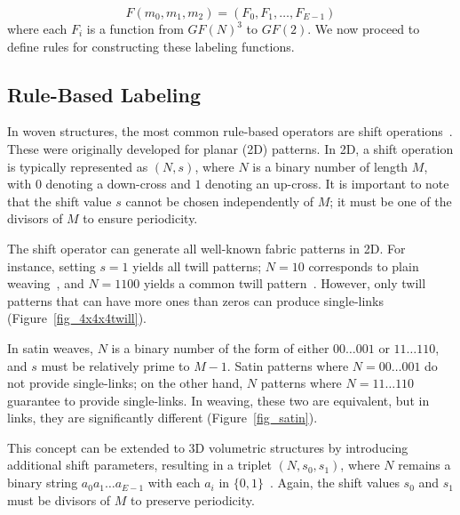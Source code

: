 \documentclass[times,twocolumn,final]{elsarticle}
\begin{document}
$$F(m_0, m_1, m_2) = \left(F_0, F_1, \ldots, F_{E-1} \right)$$
where each $F_i$ is a function from $GF(N)^3$ to $GF(2)$. We now proceed to define rules for constructing these labeling functions.

\subsection{Rule-Based Labeling}

In woven structures, the most common rule-based operators are shift operations~\cite{grunbaum1980satins, grunbaum1985catalogue, grunbaum1986extension, grunbaum1988isonemal}. These were originally developed for planar (2D) patterns. In 2D, a shift operation is typically represented as $(N,s)$, where $N$ is a binary number of length $M$, with $0$ denoting a down-cross and $1$ denoting an up-cross. It is important to note that the shift value $s$ cannot be chosen independently of $M$; it must be one of the divisors of $M$ to ensure periodicity.

The shift operator can generate all well-known fabric patterns in 2D. For instance, setting $s=1$ yields all twill patterns; $N=10$ corresponds to plain weaving~\cite{akleman2009cyclic}, and $N=1100$ yields a common twill pattern~\cite{akleman2011cyclic}. However, only twill patterns that can have more ones than zeros can produce single-links (Figure~\ref{fig_4x4x4twill}).

In satin weaves, $N$ is a binary number of the form of either $00\ldots001$ or $11\ldots110$, and $s$ must be relatively prime to $M-1$. Satin patterns where $N=00\ldots001$ do not provide single-links; on the other hand, $N$ patterns where $N=11\ldots110$ guarantee to provide single-links. In weaving, these two are equivalent, but in links, they are significantly different (Figure~\ref{fig_satin}). 

This concept can be extended to 3D volumetric structures by introducing additional shift parameters, resulting in a triplet $(N, s_0, s_1)$, where $N$ remains a binary string $a_0a_1\ldots a_{E-1}$ with each $a_i$ in $\{0,1\}$~\cite{yildiz2024volumetric}. Again, the shift values $s_0$ and $s_1$ must be divisors of $M$ to preserve periodicity.
\end{document}
